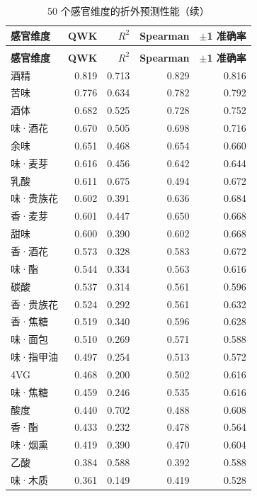 \documentclass[zihao=-4,a4paper,UTF8,fontset=none]{ctexart}
\begin{document}
\begin{longtable}{@{}p{}rrrr@{}}
\caption{50 个感官维度的折外预测性能（按 QWK 降序）}\\
\toprule
\textbf{感官维度} & \textbf{QWK} & \textbf{$R^2$} & \textbf{Spearman} & \textbf{$\pm$1 准确率} \\ \midrule
\endfirsthead
\caption*{50 个感官维度的折外预测性能（续）}\\
\toprule
\textbf{感官维度} & \textbf{QWK} & \textbf{$R^2$} & \textbf{Spearman} & \textbf{$\pm$1 准确率} \\ \midrule
\endhead
\bottomrule
\endlastfoot
酒精 & 0.819 & 0.713 & 0.829 & 0.816 \\
苦味 & 0.776 & 0.634 & 0.782 & 0.792 \\
酒体 & 0.682 & 0.525 & 0.728 & 0.752 \\
味·酒花 & 0.670 & 0.505 & 0.698 & 0.716 \\
余味 & 0.651 & 0.468 & 0.654 & 0.660 \\
味·麦芽 & 0.616 & 0.456 & 0.642 & 0.644 \\
乳酸 & 0.611 & 0.675 & 0.494 & 0.672 \\
味·贵族花 & 0.602 & 0.391 & 0.636 & 0.684 \\
香·麦芽 & 0.601 & 0.447 & 0.650 & 0.668 \\
甜味 & 0.600 & 0.390 & 0.602 & 0.668 \\
香·酒花 & 0.573 & 0.328 & 0.583 & 0.672 \\
味·酯 & 0.544 & 0.334 & 0.563 & 0.616 \\
碳酸 & 0.537 & 0.314 & 0.561 & 0.596 \\
香·贵族花 & 0.524 & 0.292 & 0.561 & 0.632 \\
香·焦糖 & 0.519 & 0.340 & 0.596 & 0.628 \\
味·面包 & 0.510 & 0.269 & 0.571 & 0.588 \\
味·指甲油 & 0.497 & 0.254 & 0.513 & 0.572 \\
4VG & 0.468 & 0.200 & 0.502 & 0.616 \\
味·焦糖 & 0.459 & 0.246 & 0.535 & 0.616 \\
酸度 & 0.440 & 0.702 & 0.488 & 0.608 \\
香·酯 & 0.433 & 0.232 & 0.478 & 0.564 \\
味·烟熏 & 0.419 & 0.390 & 0.470 & 0.604 \\
乙酸 & 0.384 & 0.588 & 0.392 & 0.588 \\
味·木质 & 0.361 & 0.149 & 0.419 & 0.528 \\

\end{longtable}
\end{document}
